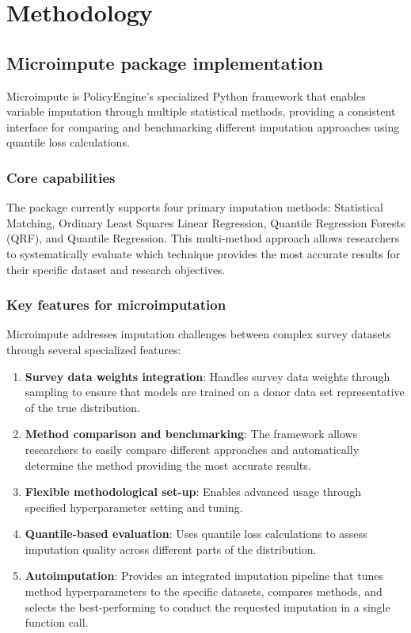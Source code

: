 \section{Methodology}\label{sec:methodology}

\subsection{Microimpute package implementation}

Microimpute is PolicyEngine's specialized Python framework that enables variable imputation through multiple statistical methods, providing a consistent interface for comparing and benchmarking different imputation approaches using quantile loss calculations.

\subsubsection{Core capabilities}

The package currently supports four primary imputation methods: Statistical Matching, Ordinary Least Squares Linear Regression, Quantile Regression Forests (QRF), and Quantile Regression. This multi-method approach allows researchers to systematically evaluate which technique provides the most accurate results for their specific dataset and research objectives.

\subsubsection{Key features for microimputation}

Microimpute addresses imputation challenges between complex survey datasets through several specialized features:

\begin{enumerate}
    \item \textbf{Survey data weights integration}: Handles survey data weights through sampling to ensure that models are trained on a donor data set representative of the true distribution.
    \item \textbf{Method comparison and benchmarking}: The framework allows researchers to easily compare different approaches and automatically determine the method providing the most accurate results.
    \item \textbf{Flexible methodological set-up}: Enables advanced usage through specified hyperparameter setting and tuning.
    \item \textbf{Quantile-based evaluation}: Uses quantile loss calculations to assess imputation quality across different parts of the distribution.
    \item \textbf{Autoimputation}: Provides an integrated imputation pipeline that tunes method hyperparameters to the specific datasets, compares methods, and selects the best-performing to conduct the requested imputation in a single function call.
\end{enumerate}

